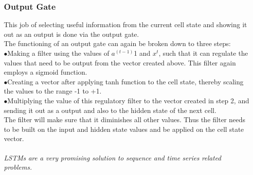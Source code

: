   \subsubsection{Output Gate}
  This job of selecting useful information from the current cell state and showing it out as an output is done via the output gate.\\The functioning of an output gate can again be broken down to three steps:\\
\indent$\bullet$Making a filter using the values of $a^{(t-1)}$1 and $x^t$, such that it can regulate the values that need to be output from the vector created above. This filter again employs a sigmoid function.\\
\indent$\bullet$Creating a vector after applying tanh function to the cell state, thereby scaling the values to the range -1 to +1.\\
\indent$\bullet$Multiplying the value of this regulatory filter to the vector created in step 2, and sending it out as a output and also to the hidden state of the next cell.\\
The filter will make sure that it diminishes all other values. Thus the filter needs to be built on the input and hidden state values and be applied on the cell state vector.\\\\
\textit{LSTMs are a very promising solution to sequence and time series related problems.}